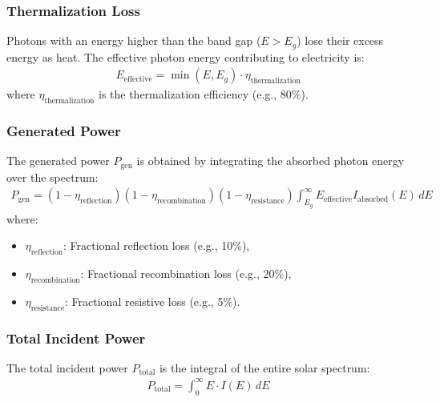\documentclass[letterpaper,10pt,english]{jupyterBook}
\begin{document}
\subsubsection{Thermalization Loss}
\label{\detokenize{ProjectInstructions:thermalization-loss}}
\sphinxAtStartPar
Photons with an energy higher than the band gap (\(E > E_g\)) lose their
excess energy as heat. The effective photon energy contributing to
electricity is:
\begin{equation*}
\begin{split}E_{\text{effective}} = \min(E, E_g) \cdot \eta_{\text{thermalization}}\end{split}
\end{equation*}
\sphinxAtStartPar
where \(\eta_{\text{thermalization}}\) is the thermalization efficiency
(e.g., 80\%).


\subsubsection{Generated Power}
\label{\detokenize{ProjectInstructions:generated-power}}
\sphinxAtStartPar
The generated power \(P_{\text{gen}}\) is obtained by integrating the
absorbed photon energy over the spectrum:
\begin{equation*}
\begin{split}P_{\text{gen}} = (1 - \eta_{\text{reflection}})(1 - \eta_{\text{recombination}})(1 - \eta_{\text{resistance}}) \int_{E_g}^\infty E_{\text{effective}} I_{\text{absorbed}}(E) \, dE\end{split}
\end{equation*}
\sphinxAtStartPar
where:
\begin{itemize}
\item {} 
\sphinxAtStartPar
\(\eta_{\text{reflection}}\): Fractional reflection loss (e.g., 10\%),

\item {} 
\sphinxAtStartPar
\(\eta_{\text{recombination}}\): Fractional recombination loss (e.g.,
20\%),

\item {} 
\sphinxAtStartPar
\(\eta_{\text{resistance}}\): Fractional resistive loss (e.g., 5\%).

\end{itemize}


\subsubsection{Total Incident Power}
\label{\detokenize{ProjectInstructions:total-incident-power}}
\sphinxAtStartPar
The total incident power \(P_{\text{total}}\) is the integral of the
entire solar spectrum:
\begin{equation*}
\begin{split}P_{\text{total}} = \int_0^\infty E \cdot I(E) \, dE\end{split}
\end{equation*}
\end{document}
